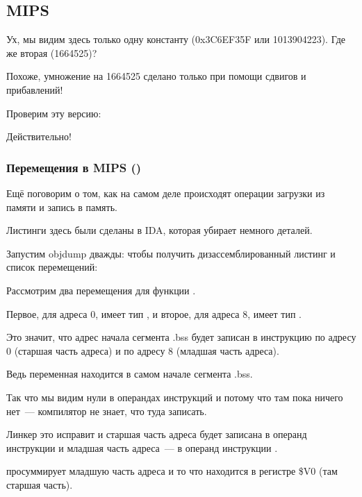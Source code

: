\subsection{MIPS}



Ух, мы видим здесь только одну константу (0x3C6EF35F или 1013904223).
Где же вторая (1664525)?

Похоже, умножение на 1664525 сделано только при помощи сдвигов и прибавлений!

Проверим эту версию:





Действительно!

\subsubsection{Перемещения в MIPS ()}

Ещё поговорим о том, как на самом деле происходят операции загрузки из памяти и запись в память.

Листинги здесь были сделаны в IDA, которая убирает немного деталей.

Запустим objdump дважды: чтобы получить дизассемблированный листинг и список перемещений:



Рассмотрим два перемещения для функции .

Первое, для адреса 0, имеет тип , и второе, для адреса 8, имеет тип .

Это значит, что адрес начала сегмента .bss будет записан в инструкцию по адресу 0 (старшая часть адреса)
и по адресу 8 (младшая часть адреса).

Ведь переменная  находится в самом начале сегмента .bss.

Так что мы видим нули в операндах инструкций \LUI и \SW потому что там пока ничего нет~--- 
компилятор не знает, что туда записать.

Линкер это исправит и старшая часть адреса будет записана в операнд инструкции \LUI и младшая часть адреса~---
в операнд инструкции \SW.

\SW просуммирует младшую часть адреса и то что находится в регистре \$V0 (там старшая часть).

